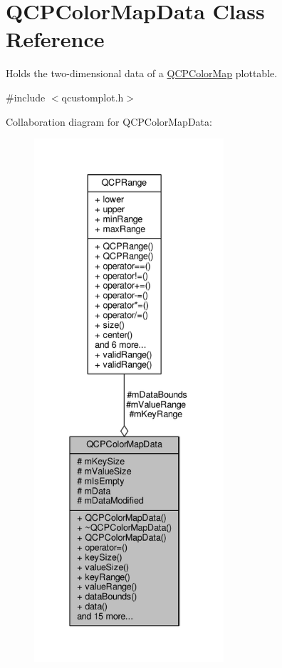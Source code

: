 \hypertarget{class_q_c_p_color_map_data}{}\section{Q\+C\+P\+Color\+Map\+Data Class Reference}
\label{class_q_c_p_color_map_data}


Holds the two-\/dimensional data of a \hyperlink{class_q_c_p_color_map}{Q\+C\+P\+Color\+Map} plottable.  




{\ttfamily \#include $<$qcustomplot.\+h$>$}



Collaboration diagram for Q\+C\+P\+Color\+Map\+Data\+:\nopagebreak
\begin{figure}[H]
\begin{center}
\leavevmode
\includegraphics[height=550pt]{class_q_c_p_color_map_data__coll__graph}
\end{center}
\end{figure}
